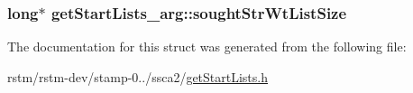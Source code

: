\hypertarget{structgetStartLists__arg_a9cd84b200e7ad14ee9725f0f3cdb6a4c}{
\subsubsection[{sought\-Str\-Wt\-List\-Size}]{\setlength{\rightskip}{0pt plus 5cm}long$\ast$ get\-Start\-Lists\-\_\-arg\-::sought\-Str\-Wt\-List\-Size}}\label{structgetStartLists__arg_a9cd84b200e7ad14ee9725f0f3cdb6a4c}


The documentation for this struct was generated from the following file\-:\begin{DoxyCompactItemize}
\item 
rstm/rstm-\/dev/stamp-\/0../ssca2/\hyperlink{getStartLists_8h}{get\-Start\-Lists.\-h}\end{DoxyCompactItemize}
